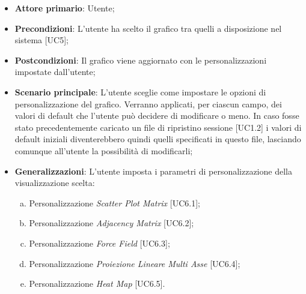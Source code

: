 \begin{itemize}
	\item \textbf{Attore primario}: Utente;
	
	\item \textbf{Precondizioni}: L'utente ha scelto il grafico tra quelli a disposizione nel sistema [UC5];
	
	\item \textbf{Postcondizioni}: Il grafico viene aggiornato con le personalizzazioni impostate dall'utente;
	
	\item \textbf{Scenario principale}: L’utente sceglie come impostare le opzioni di personalizzazione del grafico. Verranno applicati, per ciascun campo, dei valori di default che l'utente può decidere di modificare o meno. In caso fosse stato precedentemente caricato un file di ripristino sessione [UC1.2] i valori di default iniziali diventerebbero quindi quelli specificati in questo file, lasciando comunque all'utente la possibilità di modificarli;
	
	\item \textbf{Generalizzazioni}: L'utente imposta i parametri di personalizzazione della visualizzazione scelta:
	\begin{enumerate}[(a)]
	\item Personalizzazione \textit{Scatter Plot Matrix} [UC6.1];
	\item Personalizzazione \textit{Adjacency Matrix} [UC6.2];
	\item Personalizzazione \textit{Force Field} [UC6.3];
	\item Personalizzazione \textit{Proiezione Lineare Multi Asse} [UC6.4];
	\item Personalizzazione \textit{Heat Map} [UC6.5].
	\end{enumerate}
		
\end{itemize}


